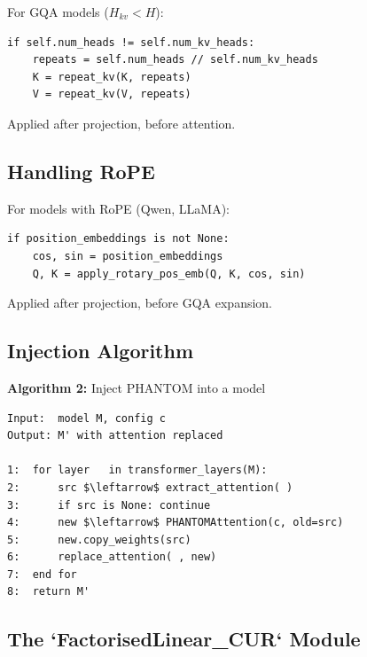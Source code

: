 For GQA models ($H_{kv} < H$):

\begin{lstlisting}
if self.num_heads != self.num_kv_heads:
    repeats = self.num_heads // self.num_kv_heads
    K = repeat_kv(K, repeats)
    V = repeat_kv(V, repeats)
\end{lstlisting}

Applied after projection, before attention.

\subsection{Handling RoPE}

For models with RoPE (Qwen, LLaMA):

\begin{lstlisting}
if position_embeddings is not None:
    cos, sin = position_embeddings
    Q, K = apply_rotary_pos_emb(Q, K, cos, sin)
\end{lstlisting}

Applied after projection, before GQA expansion.

\subsection{Injection Algorithm}

\textbf{Algorithm 2:} Inject PHANTOM into a model
\begin{lstlisting}
Input:  model M, config c
Output: M' with attention replaced

1:  for layer   in transformer_layers(M):
2:      src $\leftarrow$ extract_attention( )
3:      if src is None: continue
4:      new $\leftarrow$ PHANTOMAttention(c, old=src)
5:      new.copy_weights(src)
6:      replace_attention( , new)
7:  end for
8:  return M'
\end{lstlisting}

\subsection{The `FactorisedLinear\_CUR` Module}


